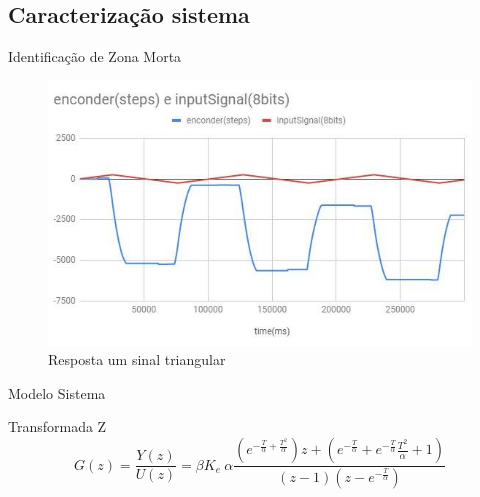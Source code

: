 \documentclass{beamer}
\begin{document}
\subsection{Caracterização sistema}

\begin{frame}{Identificação de Zona Morta}
\begin{figure}
    \centering
    \includegraphics[width = \linewidth]{src/tex/img/grafico_dente_serra.jpg}
    \caption{Resposta um sinal triangular}
    \label{fig:control_1}
\end{figure}
\end{frame}

\begin{frame}{Modelo Sistema}
    \begin{block}{Transformada Z}
        \begin{equation}
        G(z) = \frac{Y(z)}{U(z)} = \beta K_e \ \alpha \frac{\left(e^{-\frac{T}{\alpha} + \frac{T^2}{\alpha}}\right)z + \left(e^{-\frac{T}{\alpha}}+e^{-\frac{T}{\alpha}}\frac{T^2}{\alpha}+1\right)  }{\left(z-1\right)\left(z-e^{-\frac{T}{\alpha}}\right)}
        \label{transfdisc}
        \end{equation}
    \end{block}
\end{frame}
\end{document}
